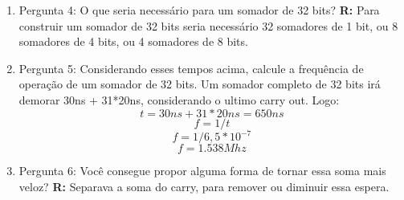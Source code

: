 \documentclass[a4paper,11pt]{article}
\begin{document}
\begin{enumerate}
\begin{enumerate}
            \item{Pergunta 4: O que seria necessário para um somador de 32 bits?}
                \newline
                \textbf{R:} Para construir um somador de 32 bits seria necessário 32 somadores de 1 bit, ou 8 somadores de 4 bits, ou 4 somadores de 8 bits.
                \bigskip
            \item{Pergunta 5: Considerando esses tempos acima, calcule a frequência de operação de um somador
                    de 32 bits.}
                \newline
                Um somador completo de 32 bits irá demorar 30ns + 31*20ns, considerando o ultimo carry out.
                Logo:
                $$ t = 30ns + 31 * 20ns = 650ns $$
                $$ f = 1 / t $$
                $$ f = 1 / 6,5 * 10^{-7} $$
                $$ f = 1.538 Mhz $$
                \bigskip
            \item{Pergunta 6: Você consegue propor alguma forma de tornar essa soma mais veloz?}
                \newline
                \textbf{R:} Separava a soma do carry, para remover ou diminuir essa espera.
                \bigskip
        \end{enumerate}
\end{enumerate}
\end{document}
